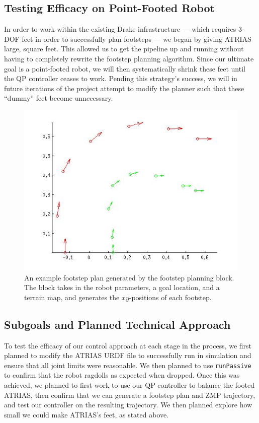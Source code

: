 \documentclass[letterpaper, 10 pt, conference]{ieeeconf}  %
\begin{document}
\subsection{Testing Efficacy on Point-Footed Robot}

In order to work within the existing Drake infrastructure --- which requires 3-DOF feet in order to successfully plan footsteps --- we began by giving ATRIAS large, square feet. This allowed us to get the pipeline up and running without having to completely rewrite the footstep planning algorithm. Since our ultimate goal is a point-footed robot, we will then systematically shrink these feet until the QP controller ceases to work. Pending this strategy’s success, we will in future iterations of the project attempt to modify the planner such that these “dummy” feet become unnecessary.

   \begin{figure}[thpb]
      \centering
      \includegraphics[scale=0.5]{figures/footstep_plan.jpg}
      \caption{An example footstep plan generated by the footstep planning block. The block takes in the robot parameters, a goal location, and a terrain map, and generates the $xy$-positions of each footstep.}
      \label{footstep}
   \end{figure}

\subsection{Subgoals and Planned Technical Approach}

To test the efficacy of our control approach at each stage in the process, we first planned to modify the ATRIAS URDF file to successfully run in simulation and ensure that all joint limits were reasonable. We then planned to use {\tt runPassive} to confirm that the robot ragdolls as expected when dropped. Once this was achieved, we planned to first work to use our QP controller to balance the footed ATRIAS, then confirm that we can generate a footstep plan and ZMP trajectory, and test our controller on the resulting trajectory. We then planned explore how small we could make ATRIAS's feet, as stated above.
\end{document}
